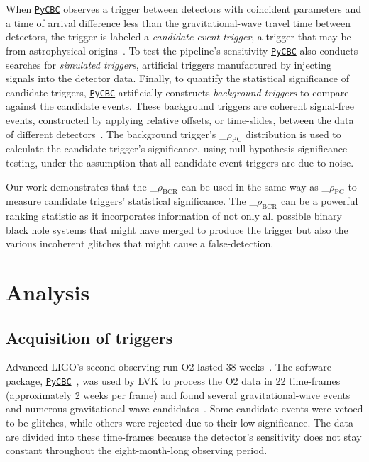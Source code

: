 \documentclass[%
 nofootinbib,
 amsmath,amssymb,
 aps,
 twocolumn,
 superscriptaddress
]{revtex4-2}
\newcommand{\pycbc}{{\sc \href{https://pycbc.org/}{\texttt{PyCBC}}}\xspace}
\newcommand{\mathcmd}[1]{{\sc \relax\ifmmode#1\else $#1$\fi}\xspace}
\newcommand{\bcr}{\mathcmd{\rho_\text{BCR}}}
\newcommand{\pycbcstat}{\mathcmd{\rho_\text{PC}}}
\begin{document}
When \pycbc observes a trigger between detectors with coincident parameters and a time of arrival difference less than the gravitational-wave travel time between detectors, the trigger is labeled a \textit{candidate event trigger}, a trigger that may be from astrophysical origins~\cite{pycbc_og1}. To test the pipeline's sensitivity \pycbc also conducts searches for \textit{simulated triggers}, artificial triggers manufactured by injecting signals into the detector data. Finally, to quantify the statistical significance of candidate triggers, \pycbc artificially constructs \textit{background triggers} to compare against the candidate events. These background triggers are coherent signal-free events, constructed by applying relative offsets, or time-slides, between the data of different detectors~\cite{pycbc_og6}. The background trigger's \pycbcstat distribution is used to calculate the candidate trigger's significance,  using null-hypothesis significance testing, under the assumption that all candidate event triggers are due to noise.

Our work demonstrates that the \bcr can be used in the same way as \pycbcstat to measure candidate triggers' statistical significance.  The \bcr can be a powerful ranking statistic as it incorporates information of not only all possible binary black hole systems that might have merged to produce the trigger but also the various incoherent glitches that might cause a false-detection. 

\section{Analysis}\label{sec:Analysis}

\subsection{Acquisition of triggers}
Advanced LIGO's second observing run O2 lasted $38$ weeks~\cite{GWOSC}. The software package, \pycbc~\cite{pycbc_code}, was used by LVK to process the O2 data in 22 time-frames (approximately 2 weeks per frame) and found several gravitational-wave events and numerous gravitational-wave candidates~\cite{pycbc_og0, pycbc_og1, pycbc_og2, pycbc_og3, pycbc_og4, pycbc_og5, pycbc_og6}. Some candidate events were vetoed to be glitches, while others were rejected due to their low significance. The data are divided into these time-frames because the detector's sensitivity does not stay constant throughout the eight-month-long observing period.
\end{document}
